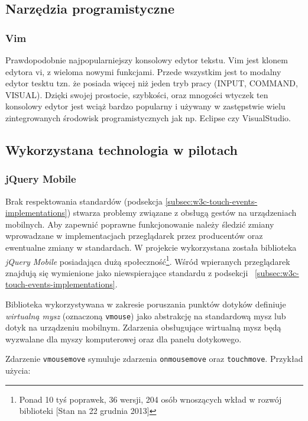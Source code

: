 \subsection{Narzędzia programistyczne}

\subsubsection{Vim}
\label{sub:Vim}
Prawdopodobnie najpopularniejszy konsolowy edytor tekstu. Vim jest klonem edytora vi, z wieloma nowymi funkcjami. Przede wszystkim jest to modalny edytor tesktu tzn. że posiada więcej niż jeden tryb pracy (INPUT, COMMAND, VISUAL). Dzięki swojej prostocie, szybkości, oraz mnogości wtyczek ten konsolowy edytor jest wciąż bardzo popularny i używany w zastępstwie wielu zintegrowanych środowisk programistycznych jak np. Eclipse czy VisualStudio.  

\subsection{Wykorzystana technologia w pilotach}

\subsubsection{jQuery Mobile}
\label{subsub:tool-jquery-mobile}

Brak respektowania standardów (podsekcja \ref{subsec:w3c-touch-events-implementations}) stwarza problemy związane z obsługą gestów na urządzeniach mobilnych. Aby zapewnić poprawne funkcjonowanie należy śledzić zmiany wprowadzane w implementacjach przeglądarek przez producentów oraz ewentualne zmiany w standardach. W projekcie wykorzystana została biblioteka \emph{jQuery Mobile} posiadająca dużą społeczność\footnote{Ponad 10 tyś poprawek, 36 wersji, 204 osób wnoszących wkład w rozwój biblioteki [Stan na 22 grudnia 2013]}. Wśród wpieranych przeglądarek znajdują się wymienione jako niewspierające standardu z podsekcji ~\ref{subsec:w3c-touch-events-implementations}.

Biblioteka wykorzystywana w zakresie poruszania punktów dotyków definiuje \emph{wirtualną mysz} (oznaczoną \lstinline{vmouse}) jako abstrakcję na standardową mysz lub dotyk na urządzeniu mobilnym. Zdarzenia obsługujące wirtualną mysz będą wyzwalane dla myszy komputerowej oraz dla panelu dotykowego.

Zdarzenie \lstinline{vmousemove} symuluje zdarzenia \lstinline{onmousemove} oraz \lstinline{touchmove}. Przykład użycia:

